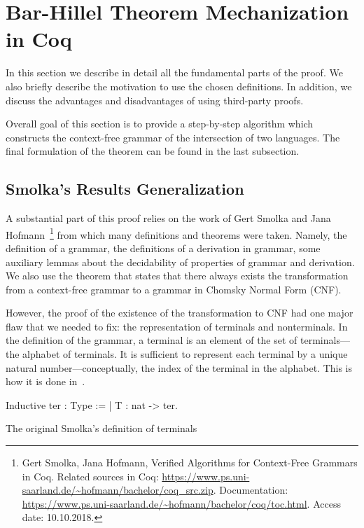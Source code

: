 \section{Bar-Hillel Theorem Mechanization in Coq}
\label{sec:main}

In this section we describe in detail all the fundamental parts of the proof. 
We also briefly describe the motivation to use the chosen definitions. 
In addition, we discuss the advantages and disadvantages of using third-party proofs. 

Overall goal of this section is to provide a step-by-step algorithm which constructs the context-free grammar of the intersection of two languages.
The final formulation of the theorem can be found in the last subsection. 
   
\subsection{ Smolka's Results Generalization}
\label{sec:solka-generalized}

A substantial part of this proof relies on the work of Gert Smolka and Jana Hofmann~\cite{smolkaHofmann2016}\footnote{Gert Smolka, Jana Hofmann, Verified Algorithms for Context-Free Grammars in Coq. Related sources in Coq: \url{https://www.ps.uni-saarland.de/~hofmann/bachelor/coq_src.zip}. Documentation: \url{https://www.ps.uni-saarland.de/~hofmann/bachelor/coq/toc.html}. Access date: 10.10.2018.} from which many definitions and theorems were taken. Namely, the definition of a grammar, the definitions of a derivation in grammar, some auxiliary lemmas about the decidability of properties of grammar and derivation. We also use the theorem that states that there always exists the transformation from a context-free grammar to a grammar in Chomsky Normal Form (CNF).

However, the proof of the existence of the transformation to CNF had one major flaw that we needed to fix: the representation of terminals and nonterminals.
In the definition of the grammar, a terminal is an element of the set of terminals---the alphabet of terminals. 
It is sufficient to represent each terminal by a unique natural number---conceptually, the index of the terminal in the alphabet. 
This is how it is done in~\cite{smolkaHofmann2016}. 

\begin{listing}[h]
	\begin{pyglist}[language=coq, numbers=none, numbersep=5pt]
  Inductive ter : Type := | T : nat -> ter.
	\end{pyglist}
	\caption{The original Smolka's definition of terminals}
	\label{lst:terms}
\end{listing}

